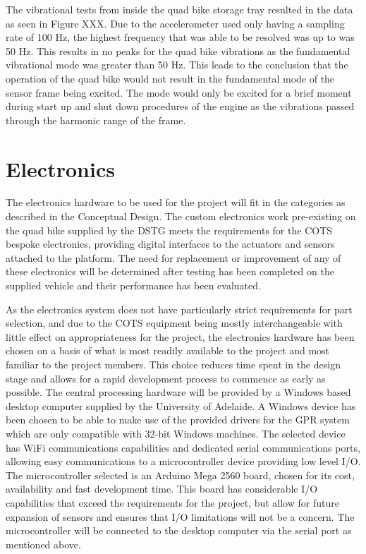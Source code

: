 \documentclass[main.tex]{subfiles}
\begin{document}
The vibrational tests from inside the quad bike storage tray resulted in the data as seen in Figure XXX. Due to the accelerometer used only having a sampling rate of 100 Hz, the highest frequency that was able to be resolved was up to was 50 Hz. This results in no peaks for the quad bike vibrations as the fundamental vibrational mode was greater than 50 Hz. This leads to the conclusion that the operation of the quad bike would not result in the fundamental mode of the sensor frame being excited. The mode would only be excited for a brief moment during start up and shut down procedures of the engine as the vibrations passed through the harmonic range of the frame.

\section{Electronics}
The electronics hardware to be used for the project will fit in the categories as described in the Conceptual Design. The custom electronics work pre-existing on the quad bike supplied by the DSTG meets the requirements for the COTS bespoke electronics, providing digital interfaces to the actuators and sensors attached to the platform. The need for replacement or improvement of any of these electronics will be determined after testing has been completed on the supplied vehicle and their performance has been evaluated.

As the electronics system does not have particularly strict requirements for part selection, and due to the COTS equipment being mostly interchangeable with little effect on appropriateness for the project, the electronics hardware has been chosen on a basis of what is most readily available to the project and most familiar to the project members. This choice reduces time spent in the design stage and allows for a rapid development process to commence as early as possible.
%
The central processing hardware will be provided by a Windows based desktop computer supplied by the University of Adelaide. A Windows device has been chosen to be able to make use of the provided drivers for the GPR system which are only compatible with 32-bit Windows machines. The selected device has WiFi communications capabilities and dedicated serial communications ports, allowing easy communications to a microcontroller device providing low level I/O.
%
The microcontroller selected is an Arduino Mega 2560 board, chosen for its cost, availability and fast development time. This board has considerable I/O capabilities that exceed the requirements for the project, but allow for future expansion of sensors and ensures that I/O limitations will not be a concern. The microcontroller will be connected to the desktop computer via the serial port as mentioned above.
\end{document}
